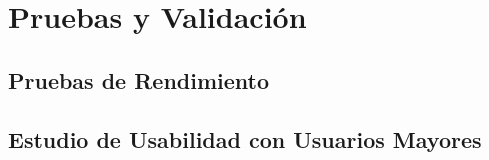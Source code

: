 \chapter{Pruebas y Validación}

\section{Pruebas de Rendimiento}

\section{Estudio de Usabilidad con Usuarios Mayores}
